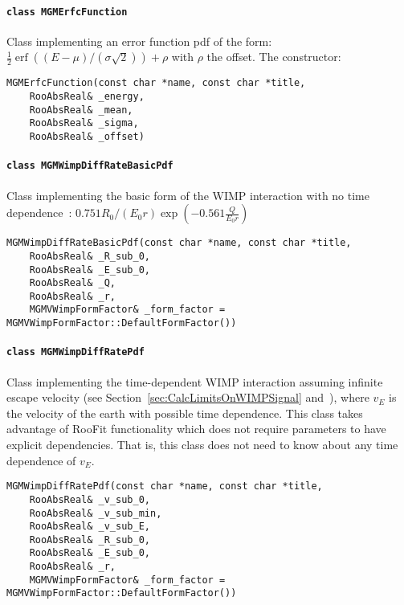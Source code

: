 			\paragraph{\lstinline!class MGMErfcFunction!}
Class implementing an error function pdf of the form: $ \frac{1}{2}\operatorname{erf} ((E-\mu)/(\sigma \sqrt{2})) + \rho$ with $\rho$ the offset.  The constructor:
				\begin{lstlisting}
MGMErfcFunction(const char *name, const char *title,
	RooAbsReal& _energy,
	RooAbsReal& _mean,
	RooAbsReal& _sigma,
	RooAbsReal& _offset)
				\end{lstlisting}			
				
			\paragraph{\lstinline!class MGMWimpDiffRateBasicPdf!}
Class implementing the basic form of the WIMP interaction with no time dependence~\cite{Lew96}: $0.751 R_{0}/(E_{0} r) \exp(-0.561 \frac{Q}{E_{0} r })$
				\begin{lstlisting}
MGMWimpDiffRateBasicPdf(const char *name, const char *title,
	RooAbsReal& _R_sub_0,
	RooAbsReal& _E_sub_0,
	RooAbsReal& _Q,
	RooAbsReal& _r,
	MGMVWimpFormFactor& _form_factor = MGMVWimpFormFactor::DefaultFormFactor())
				\end{lstlisting}	

			\paragraph{\lstinline!class MGMWimpDiffRatePdf!}
Class implementing the time-dependent WIMP interaction assuming infinite escape velocity (see Section~\ref{sec:CalcLimitsOnWIMPSignal} and~\cite{Jun96,Lew96}), where $v_{E}$ is the velocity of the earth with possible time dependence.  This class takes advantage of RooFit functionality which does not require parameters to have explicit dependencies.  That is, this class does not need to know about any time dependence of $v_{E}$.
				\begin{lstlisting}
MGMWimpDiffRatePdf(const char *name, const char *title,
	RooAbsReal& _v_sub_0,
	RooAbsReal& _v_sub_min,
	RooAbsReal& _v_sub_E,
	RooAbsReal& _R_sub_0,
	RooAbsReal& _E_sub_0,
	RooAbsReal& _r,
	MGMVWimpFormFactor& _form_factor = MGMVWimpFormFactor::DefaultFormFactor())
				\end{lstlisting}	
						
